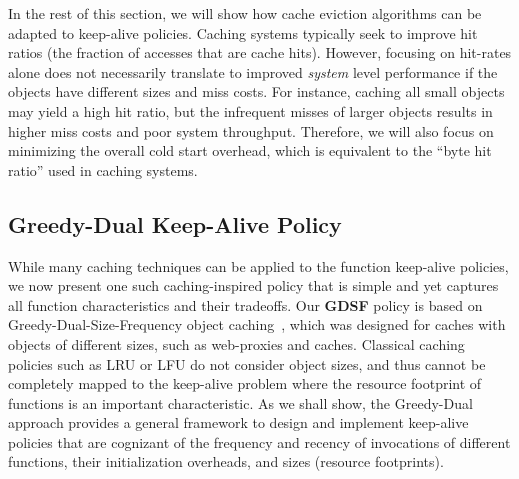 In the rest of this section, we will show how cache eviction algorithms can be adapted to keep-alive policies.
Caching systems typically seek to improve hit ratios (the fraction of accesses that are cache hits).
However, focusing on hit-rates alone does not necessarily translate to improved \emph{system} level performance if the objects have different sizes and miss costs.
For instance, caching all small objects may yield a high hit ratio, but the infrequent misses of larger objects results in higher miss costs and poor system throughput. 
Therefore, we will also focus on minimizing the overall cold start overhead, which is equivalent to the ``byte hit ratio'' used in caching systems.







\subsection{Greedy-Dual Keep-Alive Policy}
\label{subsec:gdsf}

While many caching techniques can be applied to the function keep-alive policies, we now present one such caching-inspired policy that is simple and yet captures all function characteristics and their tradeoffs.
Our \textbf{GDSF} policy is based on Greedy-Dual-Size-Frequency object caching~\cite{gdsf}, which was designed for caches with objects of  different sizes, such as web-proxies and caches. 
Classical caching policies such as LRU or LFU do not consider object sizes, and thus cannot be completely mapped to the keep-alive problem where the resource footprint of functions is an important characteristic. 
As we shall show, the Greedy-Dual approach provides a general framework to design and implement keep-alive policies that are cognizant of the  frequency and recency of invocations of different functions, their initialization overheads, and sizes (resource footprints). 


